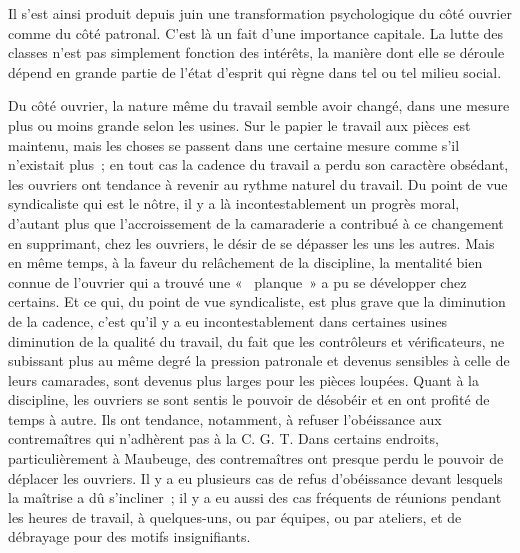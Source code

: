 \documentclass[french,twoside]{book} %
\begin{document}
Il s'est ainsi produit depuis juin une transformation psychologique du côté ouvrier comme du côté patronal. C'est là un fait d'une importance capitale. La lutte des classes n'est pas simplement fonction des intérêts, la manière dont elle se déroule dépend en grande partie de l'état d'esprit qui règne dans tel ou tel milieu social.\par
Du côté ouvrier, la nature même du travail semble avoir changé, dans une mesure plus ou moins grande selon les usines. Sur le papier le travail aux pièces est maintenu, mais les choses se passent dans une certaine mesure comme s'il n'existait plus ; en tout cas la cadence du travail a perdu son caractère obsédant, les ouvriers ont tendance à revenir au rythme naturel du travail. Du point de vue syndicaliste qui est le nôtre, il y a là incontestablement un progrès moral, d'autant plus que l'accroissement de la camaraderie a contribué à ce changement en supprimant, chez les ouvriers, le désir de se dépasser les uns les autres. Mais en même temps, à la faveur du relâchement de la discipline, la mentalité bien connue de l'ouvrier qui a trouvé une «  planque » a pu se développer chez certains. Et ce qui, du point de vue syndicaliste, est plus grave que la diminution de la cadence, c'est qu'il y a eu incontestablement dans certaines usines diminution de la qualité du travail, du fait que les contrôleurs et vérificateurs, ne subissant plus au même degré la pression patronale et devenus sensibles à celle de leurs camarades, sont devenus plus larges pour les pièces loupées. Quant à la discipline, les ouvriers se sont sentis le pouvoir de désobéir et en ont profité de temps à autre. Ils ont tendance, notamment, à refuser l'obéissance aux contremaîtres qui n'adhèrent pas à la C. G. T. Dans certains endroits, particulièrement à Maubeuge, des contremaîtres ont presque perdu le pouvoir de déplacer les ouvriers. Il y a eu plusieurs cas de refus d'obéissance devant lesquels la maîtrise a dû s'incliner ; il y a eu aussi des cas fréquents de réunions pendant les heures de travail, à quelques-uns, ou par équipes, ou par ateliers, et de débrayage pour des motifs insignifiants.\par
\end{document}
